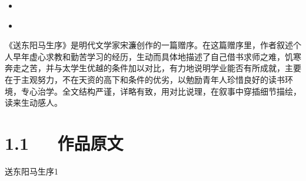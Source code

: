 \documentclass[letterpaper,12pt,english]{sphinxmanual}
\begin{document}
\begin{sphinxShadowBox}
\begin{itemize}
\begin{itemize}
\begin{itemize}
\item {} 
\label{\detokenize{p01_u6563_u6587/_u5b8b_u6fc2-_u9001_u4e1c_u9633_u9a6c_u751f_u5e8f:id21}}{\hyperref[\detokenize{p01_u6563_u6587/_u5b8b_u6fc2-_u9001_u4e1c_u9633_u9a6c_u751f_u5e8f:id9}]{}}

\item {} 
\label{\detokenize{p01_u6563_u6587/_u5b8b_u6fc2-_u9001_u4e1c_u9633_u9a6c_u751f_u5e8f:id22}}{\hyperref[\detokenize{p01_u6563_u6587/_u5b8b_u6fc2-_u9001_u4e1c_u9633_u9a6c_u751f_u5e8f:id10}]{}}

\item {} 
\label{\detokenize{p01_u6563_u6587/_u5b8b_u6fc2-_u9001_u4e1c_u9633_u9a6c_u751f_u5e8f:id23}}{\hyperref[\detokenize{p01_u6563_u6587/_u5b8b_u6fc2-_u9001_u4e1c_u9633_u9a6c_u751f_u5e8f:id11}]{}}

\end{itemize}

\item {} 
\label{\detokenize{p01_u6563_u6587/_u5b8b_u6fc2-_u9001_u4e1c_u9633_u9a6c_u751f_u5e8f:id24}}{\hyperref[\detokenize{p01_u6563_u6587/_u5b8b_u6fc2-_u9001_u4e1c_u9633_u9a6c_u751f_u5e8f:id12}]{}}

\item {} 
\label{\detokenize{p01_u6563_u6587/_u5b8b_u6fc2-_u9001_u4e1c_u9633_u9a6c_u751f_u5e8f:id25}}{\hyperref[\detokenize{p01_u6563_u6587/_u5b8b_u6fc2-_u9001_u4e1c_u9633_u9a6c_u751f_u5e8f:id13}]{}}

\end{itemize}

\end{itemize}
\end{sphinxShadowBox}

《送东阳马生序》是明代文学家宋濂创作的一篇赠序。在这篇赠序里，作者叙述个人早年虚心求教和勤苦学习的经历，生动而具体地描述了自己借书求师之难，饥寒奔走之苦，并与太学生优越的条件加以对比，有力地说明学业能否有所成就，主要在于主观努力，不在天资的高下和条件的优劣，以勉励青年人珍惜良好的读书环境，专心治学。全文结构严谨，详略有致，用对比说理，在叙事中穿插细节描绘，读来生动感人。


\section{1.1   作品原文}
\label{\detokenize{p01_u6563_u6587/_u5b8b_u6fc2-_u9001_u4e1c_u9633_u9a6c_u751f_u5e8f:id3}}
送东阳马生序1
\end{document}
